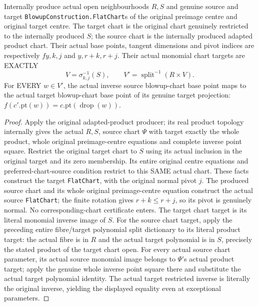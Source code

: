 \begin{theorem}
\label{hir:submersion-adapted-blowup-actual-flat-charts}
\leanok
{}

Internally produce actual open neighbourhoods $R,S$ and genuine source and target \texttt{BlowupConstruction.FlatChart}s of the original preimage centre and original target centre. The target chart is the original chart genuinely restricted to the internally produced $S$; the source chart is the internally produced adapted product chart. Their actual base points, tangent dimensions and pivot indices are respectively $fy,k,j$ and $y,r+k,r+j$. Their actual monomial chart targets are EXACTLY
\[
 V=\sigma_{k,j}^{-1}(S),\qquad
 V'=\operatorname{split}^{-1}(R\times V).
\]
For EVERY $w\in V'$, the actual inverse source blowup-chart base point maps to the actual target blowup-chart base point of its genuine target projection: $f(c'.\mathrm{pt}(w))=c.\mathrm{pt}(\operatorname{drop}(w))$.
\end{theorem}
\begin{proof}
Apply the original adapted-product producer; its real product topology internally gives the actual $R,S$, source chart $\Psi$ with target exactly the whole product, whole original preimage-centre equations and complete inverse point square. Restrict the original target chart to $S$ using its actual inclusion in the original target and its zero membership. Its entire original centre equations and preferred-chart-source condition restrict to this SAME actual chart. These facts construct the target \texttt{FlatChart}, with the original normal pivot $j$. The produced source chart and its whole original preimage-centre equation construct the actual source \texttt{FlatChart}; the finite rotation gives $r+k\leq r+j$, so its pivot is genuinely normal. No corresponding-chart certificate enters. The target chart target is its literal monomial inverse image of $S$. For the source chart target, apply the preceding entire fibre/target polynomial split dictionary to its literal product target: the actual fibre is in $R$ and the actual target polynomial is in $S$, precisely the stated product of the target chart open. For every actual source chart parameter, its actual source monomial image belongs to $\Psi$'s actual product target; apply the genuine whole inverse point square there and substitute the actual target polynomial identity. The actual target restricted inverse is literally the original inverse, yielding the displayed equality even at exceptional parameters.
\end{proof}


